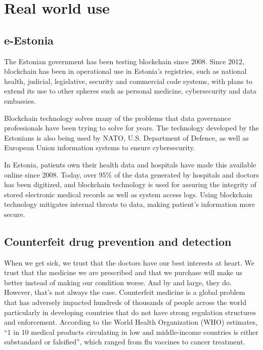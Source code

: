 \section{Real world use}

\subsection{e-Estonia} 
The Estonian government has been testing blockchain since 2008. Since 2012, blockchain has been in operational use in Estonia’s registries, such as national health, judicial, legislative, security and commercial code systems, with plans to extend its use to other spheres such as personal medicine, cybersecurity and data embassies.

Blockchain technology solves many of the problems that data governance professionals have been trying to solve for years. The technology developed by the Estonians is also being used by NATO, U.S. Department of Defence, as well as European Union information systems to ensure cybersecurity.

In Estonia, patients own their health data and hospitals have made this available online since 2008. Today, over 95\% of the data generated by hospitals and doctors has been digitized, and blockchain technology is used for assuring the integrity of stored electronic medical records as well as system access logs. Using blockchain technology mitigates internal threats to data, making patient’s information more secure. \cite{estionia}


\subsection{Counterfeit drug prevention and detection}

When we get sick, we trust that the doctors have our best interests at heart. We trust that the medicine we are prescribed and that we purchase will make us better instead of making our condition worse. And by and large, they do. However, that’s not always the case. Counterfeit medicine is a global problem that has adversely impacted hundreds of thousands of people across the world particularly in developing countries that do not have strong regulation structures and enforcement. According to the World Health Organization (WHO) estimates, “1 in 10 medical products circulating in low and middle-income countries is either substandard or falsified”, which ranged from flu vaccines to cancer treatment. \cite{fake_drugs}

